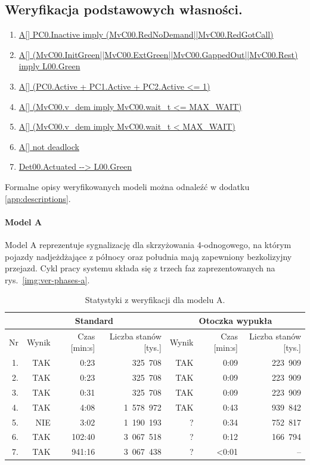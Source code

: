 \documentclass{pracamgr}
\newcommand{\imgr}[1]{rys.~\ref{#1}}
\newcommand{\ttt}[1]{\url{#1}}
\theoremstyle{plain}
\begin{document}
\subsection{Weryfikacja podstawowych własności.}
\begin{enumerate}
  \item \ttt{A[] PC0.Inactive imply (MvC00.RedNoDemand||MvC00.RedGotCall)}
  \item \ttt{A[]
  (MvC00.InitGreen||MvC00.ExtGreen||MvC00.GappedOut||MvC00.Rest) imply
  L00.Green}
  \item \ttt{A[] (PC0.Active + PC1.Active + PC2.Active <= 1)}
  \item \ttt{A[] (MvC00.v_dem imply MvC00.wait_t <= MAX_WAIT)}
  \item \ttt{A[] (MvC00.v_dem imply MvC00.wait_t < MAX_WAIT)}
  \item \ttt{A[] not deadlock}
  \item \ttt{Det00.Actuated --> L00.Green}
\end{enumerate}

Formalne opisy weryfikowanych modeli można odnaleźć w dodatku
\ref{app:descriptions}.

\paragraph{Model A} Model A reprezentuje sygnalizację dla skrzyżowania
4-odnogowego, na którym pojazdy nadjeżdżające z północy oraz południa
mają zapewniony bezkolizyjny przejazd. Cykl pracy systemu składa się z
trzech faz zaprezentowanych na \imgr{img:ver-phases-a}.
\begin{table}
  \centering
  \begin{tabular}{|r||r|r|r||r|r|r||}
    \hline
    & \multicolumn{3}{c||}{\bf Standard} & \multicolumn{3}{c||}{\bf
      Otoczka wypukła} \\ \hline
    Nr   & Wynik & Czas [min:s] & Liczba stanów [tys.] & Wynik & Czas [min:s] &
    Liczba stanów [tys.] \\ \hline
    1. & TAK & 0:23   &  325~708 & TAK & 0:09 & 223~909 \\
    2. & TAK & 0:23   &  325~708 & TAK & 0:09 & 223~909 \\
    3. & TAK & 0:31   &  325~708 & TAK & 0:09 & 223~909 \\
    4. & TAK & 4:08   & 1~578~972 & TAK & 0:43 & 939~842 \\
    5. & NIE & 3:02   & 1~190~193 & ?   & 0:34 & 752~817 \\
    6. & TAK & 102:40 & 3~067~518 & ?   & 0:12 & 166~794 \\
    7. & TAK & 941:16 & 3~067~438 & ?   & <0:01   &     --  
    \\\hline
  \end{tabular}
  \caption{Statystyki z weryfikacji dla modelu A.}
  \label{tab:ver-stats-a}
\end{table}
\end{document}
